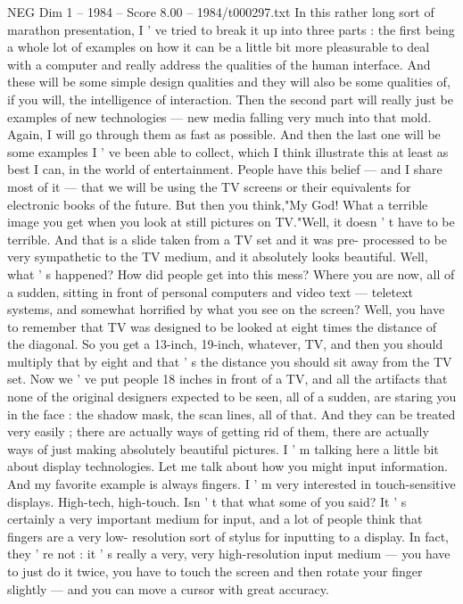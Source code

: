 \begin{textsample}{NEG Dim 1 – 1984 – Score 8.00 – 1984/t000297.txt}  \label{ex:f1_neg_046}
In this rather long sort of marathon presentation, I ' ve tried to break it up into three parts : the first being a whole lot of examples on how it can be a little bit more pleasurable to deal with a computer and really address the qualities of the human interface.
And these will be some simple design qualities and they will also be some qualities of, if you will, the intelligence of interaction.
Then the second part will really just be examples of new technologies — new media falling very much into that mold.
Again, I will go through them as fast as possible.
And then the last one will be some examples I ' ve been able to collect, which I think illustrate this at least as best I can, in the world of entertainment.
People have this belief — and I share most of it — that we will be using the TV screens or their equivalents for electronic books of the future.
But then you think,"My God!
What a terrible image you get when you look at still pictures on TV."Well, it doesn ' t have to be terrible.
And that is a slide taken from a TV set and it was pre- processed to be very sympathetic to the TV medium, and it absolutely looks beautiful.
Well, what ' s happened?
How did people get into this mess?
Where you are now, all of a sudden, sitting in front of personal computers and video text — teletext systems, and somewhat horrified by what you see on the screen?
Well, you have to remember that TV was designed to be looked at eight times the distance of the diagonal.
So you get a 13-inch, 19-inch, whatever, TV, and then you should multiply that by eight and that ' s the distance you should sit away from the TV set.
Now we ' ve put people 18 inches in front of a TV, and all the artifacts that none of the original designers expected to be seen, all of a sudden, are staring you in the face : the shadow mask, the scan lines, all of that.
And they can be treated very easily ; there are actually ways of getting rid of them, there are actually ways of just making absolutely beautiful pictures.
I ' m talking here a little bit about display technologies.
Let me talk about how you might input information.
And my favorite example is always fingers.
I ' m very interested in touch-sensitive displays.
High-tech, high-touch.
Isn ' t that what some of you said?
It ' s certainly a very important medium for input, and a lot of people think that fingers are a very low- resolution sort of stylus for inputting to a display.
In fact, they ' re not : it ' s really a very, very high-resolution input medium — you have to just do it twice, you have to touch the screen and then rotate your finger slightly — and you can move a cursor with great accuracy.

\end{textsample}

